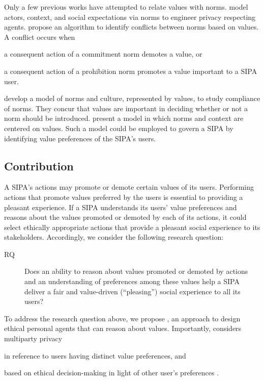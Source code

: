 Only a few previous works have attempted to relate values with norms.
\citet{Murukannaiah-IC16-Engineering} model actors, context, and social expectations via norms to engineer privacy respecting agents. 
\citet{DaSilvaFigueiredo-COIN13} propose an algorithm to identify conflicts between norms based on values. 
A conflict occurs when
\begin{enuminline}[label=(\arabic*)]
\item a consequent action of a commitment norm demotes a value, or
\item a consequent action of a prohibition norm promotes a value important to a SIPA user.
\end{enuminline}
%
\citet{Dechesne-AIL13-Norms+Values} develop a model of norms and culture,
represented by values, to study compliance of norms. They concur that
values are important in deciding whether or not a norm should be
introduced. \citet{kayal13coin} present a model in which norms and 
context are centered on values. Such a model could be employed
to govern a SIPA by identifying value preferences of the SIPA's
users.

\subsection{Contribution}
A SIPA's actions may promote or demote certain values of its users. 
Performing actions that promote values preferred by the users is essential to providing a pleasant experience. 
%
If a SIPA understands its users' value preferences
and reasons about the values promoted or demoted by each of its actions, it 
could select ethically appropriate actions that provide a pleasant social experience to its stakeholders.
Accordingly, we consider the following research question: 

\begin{description}
\item[RQ] Does an ability to reason about values promoted or demoted by actions and an understanding of preferences among these values help a SIPA deliver a fair and value-driven (``pleasing'') social experience to all its users? 
\end{description}

To address the research question above, we propose \frameworkAinur, an
approach to design ethical personal agents that can reason about values.
Importantly, \frameworkAinur considers multiparty privacy 
\begin{enuminline}
\item in reference to users having distinct value preferences, and 
\item based on ethical decision-making in light of other user's preferences \citep{TOCHI-17:Multiuser}.
\end{enuminline} 

